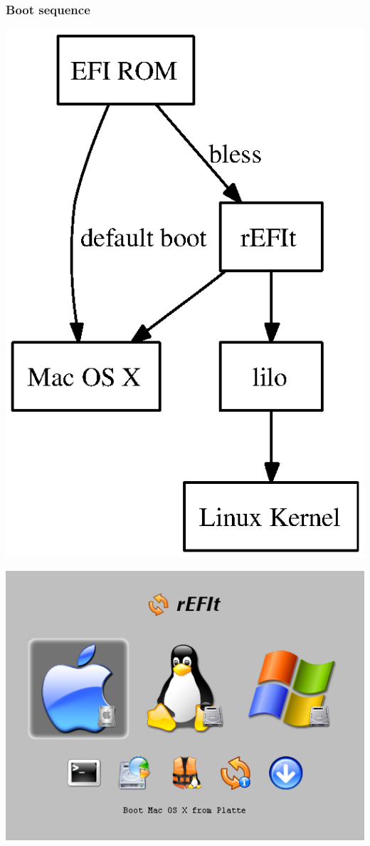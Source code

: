 \documentclass[cjk,dvipdfm]{beamer}
\begin{document}
\begin{frame}
\frametitle{Boot sequence}
\begin{minipage}[t]{0.4\hsize}
\includegraphics[height=1\hsize]{image200607/bootchain.ps}
\end{minipage}
\begin{minipage}[t]{0.58\hsize}
\includegraphics[width=1\hsize]{image200607/screen1.png}
\end{minipage}
\end{frame}
\end{document}
